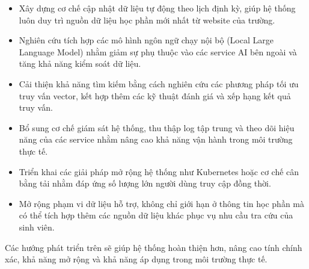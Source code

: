 \documentclass[../DoAn.tex]{subfiles}
\begin{document}
\begin{itemize}
    \item Xây dựng cơ chế cập nhật dữ liệu tự động theo lịch định kỳ, giúp hệ thống luôn duy trì nguồn dữ liệu học phần mới nhất từ website của trường.

    \item Nghiên cứu tích hợp các mô hình ngôn ngữ chạy nội bộ (Local Large Language Model) nhằm giảm sự phụ thuộc vào các service AI bên ngoài và tăng khả năng kiểm soát dữ liệu.

    \item Cải thiện khả năng tìm kiếm bằng cách nghiên cứu các phương pháp tối ưu truy vấn vector, kết hợp thêm các kỹ thuật đánh giá và xếp hạng kết quả truy vấn.

    \item Bổ sung cơ chế giám sát hệ thống, thu thập log tập trung và theo dõi hiệu năng của các service nhằm nâng cao khả năng vận hành trong môi trường thực tế.

    \item Triển khai các giải pháp mở rộng hệ thống như Kubernetes hoặc cơ chế cân bằng tải nhằm đáp ứng số lượng lớn người dùng truy cập đồng thời.

    \item Mở rộng phạm vi dữ liệu hỗ trợ, không chỉ giới hạn ở thông tin học phần mà có thể tích hợp thêm các nguồn dữ liệu khác phục vụ nhu cầu tra cứu của sinh viên.
\end{itemize}

Các hướng phát triển trên sẽ giúp hệ thống hoàn thiện hơn, nâng cao tính chính xác, khả năng mở rộng và khả năng áp dụng trong môi trường thực tế.
\end{document}
